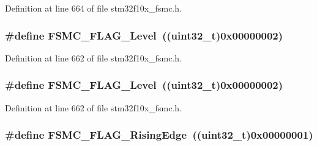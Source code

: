 Definition at line 664 of file stm32f10x\+\_\+fsmc.\+h.

\subsubsection[{\texorpdfstring{F\+S\+M\+C\+\_\+\+F\+L\+A\+G\+\_\+\+Level}{FSMC_FLAG_Level}}]{\setlength{\rightskip}{0pt plus 5cm}\#define F\+S\+M\+C\+\_\+\+F\+L\+A\+G\+\_\+\+Level~(({\bf uint32\+\_\+t})0x00000002)}\hypertarget{group___f_s_m_c___flags_ga25868d35780998a52190c424ebb3823f}{}\label{group___f_s_m_c___flags_ga25868d35780998a52190c424ebb3823f}


Definition at line 662 of file stm32f10x\+\_\+fsmc.\+h.

\subsubsection[{\texorpdfstring{F\+S\+M\+C\+\_\+\+F\+L\+A\+G\+\_\+\+Level}{FSMC_FLAG_Level}}]{\setlength{\rightskip}{0pt plus 5cm}\#define F\+S\+M\+C\+\_\+\+F\+L\+A\+G\+\_\+\+Level~(({\bf uint32\+\_\+t})0x00000002)}\hypertarget{group___f_s_m_c___flags_ga25868d35780998a52190c424ebb3823f}{}\label{group___f_s_m_c___flags_ga25868d35780998a52190c424ebb3823f}


Definition at line 662 of file stm32f10x\+\_\+fsmc.\+h.

\subsubsection[{\texorpdfstring{F\+S\+M\+C\+\_\+\+F\+L\+A\+G\+\_\+\+Rising\+Edge}{FSMC_FLAG_RisingEdge}}]{\setlength{\rightskip}{0pt plus 5cm}\#define F\+S\+M\+C\+\_\+\+F\+L\+A\+G\+\_\+\+Rising\+Edge~(({\bf uint32\+\_\+t})0x00000001)}\hypertarget{group___f_s_m_c___flags_ga5aadbd5d9f1b6a25bcc1fc6f3bf4c9cc}{}\label{group___f_s_m_c___flags_ga5aadbd5d9f1b6a25bcc1fc6f3bf4c9cc}


